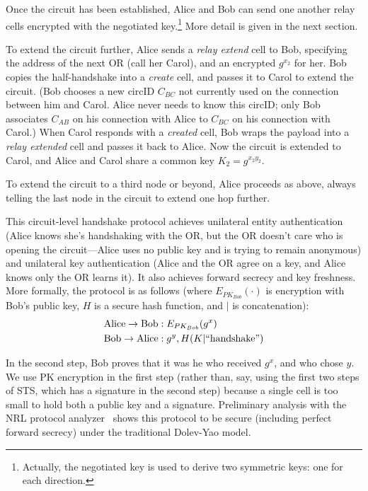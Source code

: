 \documentclass[twocolumn]{article}
\begin{document}
Once the circuit has been established, Alice and Bob can send one
another relay cells encrypted with the negotiated
key.\footnote{Actually, the negotiated key is used to derive two
  symmetric keys: one for each direction.}  More detail is given in
the next section.

To extend the circuit further, Alice sends a \emph{relay extend} cell
to Bob, specifying the address of the next OR (call her Carol), and
an encrypted $g^{x_2}$ for her.  Bob copies the half-handshake into a
\emph{create} cell, and passes it to Carol to extend the circuit.
(Bob chooses a new circID $C_{BC}$ not currently used on the connection
between him and Carol.  Alice never needs to know this circID; only Bob
associates $C_{AB}$ on his connection with Alice to $C_{BC}$ on
his connection with Carol.)
When Carol responds with a \emph{created} cell, Bob wraps the payload
into a \emph{relay extended} cell and passes it back to Alice.  Now
the circuit is extended to Carol, and Alice and Carol share a common key
$K_2 = g^{x_2 y_2}$.

To extend the circuit to a third node or beyond, Alice
proceeds as above, always telling the last node in the circuit to
extend one hop further.

This circuit-level handshake protocol achieves unilateral entity
authentication (Alice knows she's handshaking with the OR, but
the OR doesn't care who is opening the circuit---Alice uses no public key
and is trying to remain anonymous) and unilateral key authentication
(Alice and the OR agree on a key, and Alice knows only the OR learns
it). It also achieves forward
secrecy and key freshness. More formally, the protocol is as follows
(where $E_{PK_{Bob}}(\cdot)$ is encryption with Bob's public key,
$H$ is a secure hash function, and $|$ is concatenation):
\begin{equation*}
\begin{aligned}
\mathrm{Alice} \rightarrow \mathrm{Bob}&: E_{PK_{Bob}}(g^x) \\
\mathrm{Bob} \rightarrow \mathrm{Alice}&: g^y, H(K | \mathrm{``handshake"}) \\
\end{aligned}
\end{equation*}

\noindent In the second step, Bob proves that it was he who received $g^x$,
and who chose $y$. We use PK encryption in the first step
(rather than, say, using the first two steps of STS, which has a
signature in the second step) because a single cell is too small to
hold both a public key and a signature. Preliminary analysis with the
NRL protocol analyzer~\cite{meadows96} shows this protocol to be
secure (including perfect forward secrecy) under the
traditional Dolev-Yao model.\\
\end{document}
